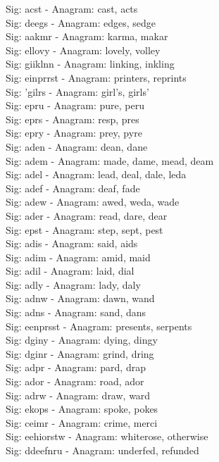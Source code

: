 Sig: {acst} - Anagram: cast, acts \\
Sig: {deegs} - Anagram: edges, sedge \\
Sig: {aakmr} - Anagram: karma, makar \\
Sig: {ellovy} - Anagram: lovely, volley \\
Sig: {giiklnn} - Anagram: linking, inkling \\
Sig: {einprrst} - Anagram: printers, reprints \\
Sig: {'gilrs} - Anagram: girl's, girls' \\
Sig: {epru} - Anagram: pure, peru \\
Sig: {eprs} - Anagram: resp, pres \\
Sig: {epry} - Anagram: prey, pyre \\
Sig: {aden} - Anagram: dean, dane \\
Sig: {adem} - Anagram: made, dame, mead, deam \\
Sig: {adel} - Anagram: lead, deal, dale, leda \\
Sig: {adef} - Anagram: deaf, fade \\
Sig: {adew} - Anagram: awed, weda, wade \\
Sig: {ader} - Anagram: read, dare, dear \\
Sig: {epst} - Anagram: step, sept, pest \\
Sig: {adis} - Anagram: said, aids \\
Sig: {adim} - Anagram: amid, maid \\
Sig: {adil} - Anagram: laid, dial \\
Sig: {adly} - Anagram: lady, daly \\
Sig: {adnw} - Anagram: dawn, wand \\
Sig: {adns} - Anagram: sand, dans \\
Sig: {eenprsst} - Anagram: presents, serpents \\
Sig: {dginy} - Anagram: dying, dingy \\
Sig: {dginr} - Anagram: grind, dring \\
Sig: {adpr} - Anagram: pard, drap \\
Sig: {ador} - Anagram: road, ador \\
Sig: {adrw} - Anagram: draw, ward \\
Sig: {ekops} - Anagram: spoke, pokes \\
Sig: {ceimr} - Anagram: crime, merci \\
Sig: {eehiorstw} - Anagram: whiterose, otherwise \\
Sig: {ddeefnru} - Anagram: underfed, refunded \\
